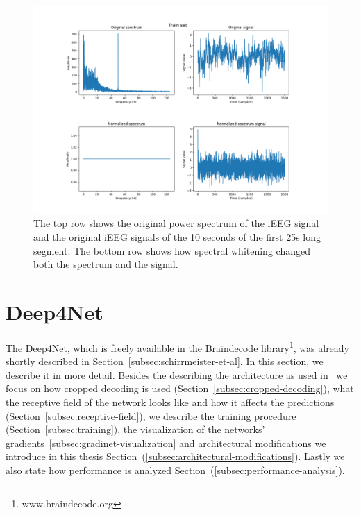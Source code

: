 \begin{figure}[!htbp]
\centering
\includegraphics[width=\linewidth]{img/ch3/spectral-whitening}
\caption[Spectral whitening]{The top row shows the original power spectrum of the iEEG signal and the original iEEG signals of the 10 seconds of the first 25s long segment.
The bottom row shows how spectral whitening changed both the spectrum and the signal.}
\label{fig:spectral-whitening}
\end{figure}


\section{Deep4Net}\label{sec:deep4net}
The Deep4Net, which is freely available in the Braindecode library\footnote{www.braindecode.org}, was already shortly described in Section~\ref{subsec:schirrmeister-et-al}.
In this section, we describe it in more detail. 
Besides the describing the architecture as used in~\cite{Hammer-2021} we focus on how cropped decoding is used (Section~\ref{subsec:cropped-decoding}), what the receptive field of the network looks like and how it affects the predictions (Section~\ref{subsec:receptive-field}), we describe the training procedure (Section~\ref{subsec:training}), the visualization of the networks' gradients~\ref{subsec:gradinet-visualization} and architectural modifications we introduce in this thesis Section~(\ref{subsec:architectural-modifications}). Lastly we also state how performance is analyzed Section~(\ref{subsec:performance-analysis}).


